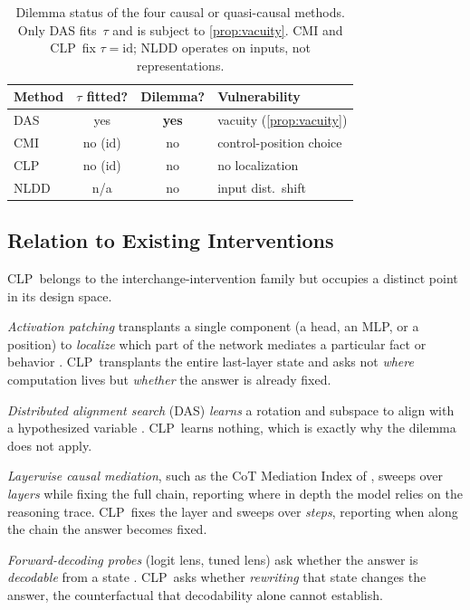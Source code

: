 \documentclass[11pt]{article}
\newcommand{\CLP}{\textsc{CLP}}
\begin{document}
\begin{table}[ht]
\centering\small
\setlength{\tabcolsep}{3pt}
\begin{tabular}{@{}lccp{2.6cm}@{}}
\toprule
Method & $\tau$ fitted? & Dilemma? & Vulnerability \\
\midrule
DAS & yes & \textbf{yes} & vacuity (\cref{prop:vacuity}) \\
CMI & no ($\mathrm{id}$) & no & control-position choice \\
\CLP\ & no ($\mathrm{id}$) & no & no localization \\
NLDD & n/a & no & input dist.\ shift \\
\bottomrule
\end{tabular}
\caption{Dilemma status of the four causal or quasi-causal methods. Only DAS
fits~$\tau$ and is subject to \cref{prop:vacuity}. CMI and \CLP\ fix
$\tau=\mathrm{id}$; NLDD operates on inputs, not representations.}
\label{tab:dilemma-status}
\end{table}

\subsection{Relation to Existing Interventions}
\label{sec:clp-relation}

\CLP\ belongs to the interchange-intervention family but occupies a distinct
point in its design space.

\emph{Activation patching} transplants a single component (a head, an MLP, or a
position) to \emph{localize} which part of the network mediates a particular
fact or behavior
\citep{DBLP:conf/nips/MengBAB22,DBLP:journals/corr/abs-2404-15255}. \CLP\
transplants the entire last-layer state and asks not \emph{where} computation
lives but \emph{whether} the answer is already fixed.

\emph{Distributed alignment search} (DAS) \emph{learns} a rotation and subspace
to align with a hypothesized variable
\citep{DBLP:conf/clear2/GeigerWPIG24}. \CLP\ learns nothing, which is exactly
why the dilemma does not apply.

\emph{Layerwise causal mediation}, such as the CoT Mediation Index of
\citet{DBLP:journals/corr/abs-2602-03994}, sweeps over \emph{layers} while
fixing the full chain, reporting where in depth the model relies on the
reasoning trace. \CLP\ fixes the layer and sweeps over \emph{steps}, reporting
when along the chain the answer becomes fixed.

\emph{Forward-decoding probes} (logit lens, tuned lens) ask whether the answer
is \emph{decodable} from a state
\citep{nostalgebraist2020logitlens,DBLP:journals/corr/abs-2303-08112,DBLP:conf/conll/PalSYWB23}.
\CLP\ asks whether \emph{rewriting} that state changes the answer, the
counterfactual that decodability alone cannot establish.
\end{document}
